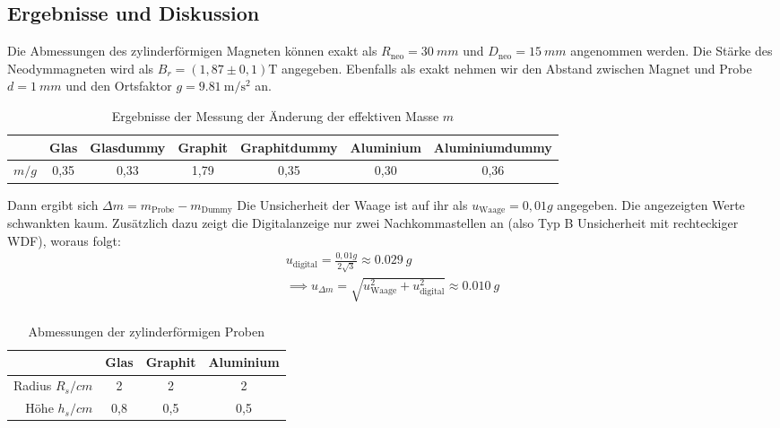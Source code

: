 \documentclass[
	a4paper,
	12pt,
	pagesize,
	ngerman
]{scrartcl}
\begin{document}
	\subsection{Ergebnisse und Diskussion}
	Die Abmessungen des zylinderförmigen Magneten können exakt als $R_\text{neo}= \SI{30}{mm}$ und $D_\text{neo}=\SI{15}{mm}$ angenommen werden. Die Stärke des Neodymmagneten wird als $B_r = (1,87 \pm 0,1 ) \si{\tesla}$ angegeben. Ebenfalls als exakt nehmen wir den Abstand zwischen Magnet und Probe $d= \SI{1}{mm}$ und den Ortsfaktor $g=\SI{9,81}{\meter \per \second \squared}$ an. 
	\newline %
	\begin{table}[h]
	\centering
	\begin{tabular}{ r | c | c | c | c | c | c}
		 & Glas & Glasdummy & Graphit & Graphitdummy & Aluminium & Aluminiumdummy\\ \hline
		$m  \si{/g}$ & 0,35 &0,33 &1,79 & 0,35 & 0,30 & 0,36\\
	\end{tabular}
	\caption{Ergebnisse der Messung der Änderung der effektiven Masse $m$}
	\end{table}
	\newline
	Dann ergibt sich $\Delta m = m_{\text{Probe}} -m_{\text{Dummy}}$ \newline
	Die Unsicherheit der Waage ist auf ihr als $u_\text{Waage}=0,01 \si{g}$ angegeben. Die angezeigten Werte schwankten kaum. Zusätzlich dazu zeigt die Digitalanzeige nur zwei Nachkommastellen an (also Typ B Unsicherheit mit rechteckiger WDF), woraus folgt:  \\
	\begin{gather*}
		u_\text{digital}=\frac{0,01 \si{g}}{2\sqrt{3}} \approx \SI{0,029}{g} \\
		\implies u_{\Delta m}= \sqrt{u_\text{Waage}^2 + u_\text{digital}^2}  \approx \SI{0,010}{g} \\
	\end{gather*}
	\newline
	
	\begin{table}[h]
	\centering
	\begin{tabular}{ r | c | c | c}
		& Glas & Graphit & Aluminium \\ \hline
		Radius $R_s \si{/cm}$ & 2 & 2 & 2\\
		Höhe $h_s \si{/cm}$ & 0,8 & 0,5 & 0,5\\
	\end{tabular} \newline
	\caption{Abmessungen der zylinderförmigen Proben}
	\end{table}
\end{document}
